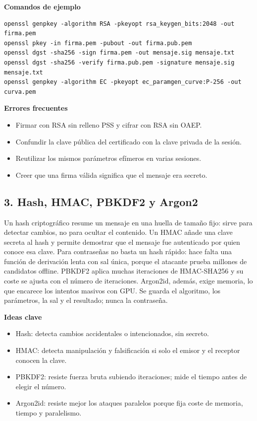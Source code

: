 \documentclass[11pt,a4paper]{article}
\begin{document}
\textbf{Comandos de ejemplo}

\begin{lstlisting}[style=estiloCodigo]
openssl genpkey -algorithm RSA -pkeyopt rsa_keygen_bits:2048 -out firma.pem
openssl pkey -in firma.pem -pubout -out firma.pub.pem
openssl dgst -sha256 -sign firma.pem -out mensaje.sig mensaje.txt
openssl dgst -sha256 -verify firma.pub.pem -signature mensaje.sig mensaje.txt
openssl genpkey -algorithm EC -pkeyopt ec_paramgen_curve:P-256 -out curva.pem
\end{lstlisting}

\textbf{Errores frecuentes}

\begin{itemize}[leftmargin=1.4em,itemsep=2pt,topsep=3pt]
  \item Firmar con RSA sin relleno PSS y cifrar con RSA sin OAEP.
  \item Confundir la clave pública del certificado con la clave privada de la sesión.
  \item Reutilizar los mismos parámetros efímeros en varias sesiones.
  \item Creer que una firma válida significa que el mensaje era secreto.
\end{itemize}


\subsection{3. Hash, HMAC, PBKDF2 y Argon2}

Un hash criptográfico resume un mensaje en una huella de tamaño fijo: sirve para detectar cambios, no para ocultar el contenido. Un HMAC añade una clave secreta al hash y permite demostrar que el mensaje fue autenticado por quien conoce esa clave. Para contraseñas no basta un hash rápido: hace falta una función de derivación lenta con sal única, porque el atacante prueba millones de candidatos offline. PBKDF2 aplica muchas iteraciones de HMAC-SHA256 y su coste se ajusta con el número de iteraciones. Argon2id, además, exige memoria, lo que encarece los intentos masivos con GPU. Se guarda el algoritmo, los parámetros, la sal y el resultado; nunca la contraseña.

\textbf{Ideas clave}

\begin{itemize}[leftmargin=1.4em,itemsep=2pt,topsep=3pt]
  \item Hash: detecta cambios accidentales o intencionados, sin secreto.
  \item HMAC: detecta manipulación y falsificación si solo el emisor y el receptor conocen la clave.
  \item PBKDF2: resiste fuerza bruta subiendo iteraciones; mide el tiempo antes de elegir el número.
  \item Argon2id: resiste mejor los ataques paralelos porque fija coste de memoria, tiempo y paralelismo.
\end{itemize}
\end{document}
